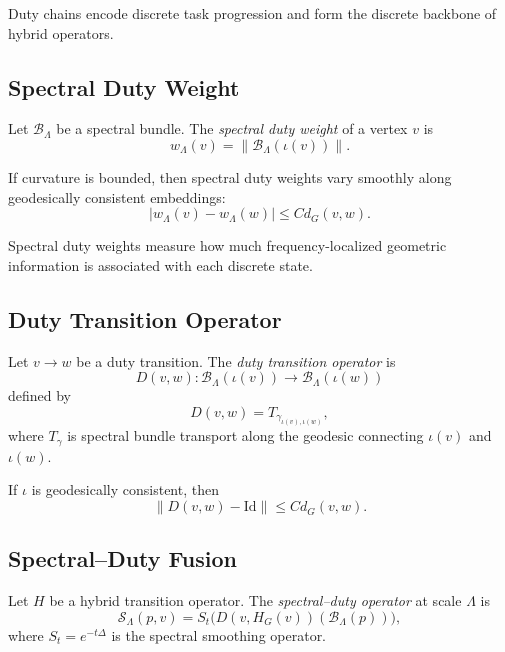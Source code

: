 \begin{remark}
Duty chains encode discrete task progression and form the discrete backbone
of hybrid operators.
\end{remark}

\subsection{Spectral Duty Weight}

\begin{definition}
Let $\mathcal{B}_\Lambda$ be a spectral bundle.  
The \emph{spectral duty weight} of a vertex $v$ is
\[
w_\Lambda(v)
= \| \mathcal{B}_\Lambda(\iota(v)) \|.
\]
\end{definition}

\begin{lemma}
If curvature is bounded, then spectral duty weights vary smoothly along
geodesically consistent embeddings:
\[
|w_\Lambda(v) - w_\Lambda(w)|
\le C d_G(v,w).
\]
\end{lemma}

\begin{remark}
Spectral duty weights measure how much frequency-localized geometric
information is associated with each discrete state.
\end{remark}

\subsection{Duty Transition Operator}

\begin{definition}
Let $v \to w$ be a duty transition.  
The \emph{duty transition operator} is
\[
D(v,w) : \mathcal{B}_\Lambda(\iota(v)) \to \mathcal{B}_\Lambda(\iota(w))
\]
defined by
\[
D(v,w) = T_{\gamma_{\iota(v),\iota(w)}},
\]
where $T_{\gamma}$ is spectral bundle transport along the geodesic
connecting $\iota(v)$ and $\iota(w)$.
\end{definition}

\begin{lemma}
If $\iota$ is geodesically consistent, then
\[
\| D(v,w) - \mathrm{Id} \|
\le C d_G(v,w).
\]
\end{lemma}

\subsection{Spectral--Duty Fusion}

\begin{definition}
Let $H$ be a hybrid transition operator.  
The \emph{spectral--duty operator} at scale $\Lambda$ is
\[
\mathcal{S}_\Lambda(p,v)
= S_t\big( D(v,H_G(v))(\mathcal{B}_\Lambda(p)) \big),
\]
where $S_t = e^{-t\Delta}$ is the spectral smoothing operator.
\end{definition}

